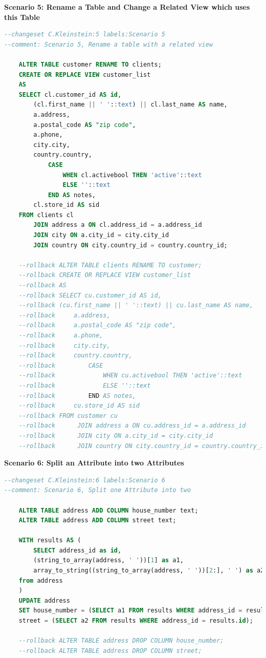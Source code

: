\newpage
\textbf{Scenario 5: Rename a Table and Change a Related View which uses this Table}\\
%
\begin{lstlisting}[language=SQL, caption={SQL Changeset Scenario 5: Rename a Table and Change a Related View which uses this Table}, label=list:scenarions:LiquibaseSQLScen5]
--changeset C.Kleinstein:5 labels:Scenario 5 
--comment: Scenario 5, Rename a table with a related view

	ALTER TABLE customer RENAME TO clients;
	CREATE OR REPLACE VIEW customer_list
	AS
	SELECT cl.customer_id AS id,
		(cl.first_name || ' '::text) || cl.last_name AS name,
		a.address,
		a.postal_code AS "zip code",
		a.phone,
		city.city,
		country.country,
			CASE
				WHEN cl.activebool THEN 'active'::text
				ELSE ''::text
			END AS notes,
		cl.store_id AS sid
	FROM clients cl
		JOIN address a ON cl.address_id = a.address_id
		JOIN city ON a.city_id = city.city_id
		JOIN country ON city.country_id = country.country_id;
	
	--rollback ALTER TABLE clients RENAME TO customer; 
	--rollback CREATE OR REPLACE VIEW customer_list
	--rollback AS
	--rollback SELECT cu.customer_id AS id,
	--rollback (cu.first_name || ' '::text) || cu.last_name AS name,
	--rollback     a.address,
	--rollback     a.postal_code AS "zip code",
	--rollback     a.phone,
	--rollback     city.city,
	--rollback     country.country,
	--rollback         CASE
	--rollback             WHEN cu.activebool THEN 'active'::text
	--rollback             ELSE ''::text
	--rollback         END AS notes,
	--rollback     cu.store_id AS sid
	--rollback FROM customer cu
	--rollback      JOIN address a ON cu.address_id = a.address_id
	--rollback      JOIN city ON a.city_id = city.city_id
	--rollback      JOIN country ON city.country_id = country.country_id;
\end{lstlisting}

\newpage
\textbf{Scenario 6: Split an Attribute into two Attributes}\\
%
\begin{lstlisting}[language=SQL, caption={SQL Changeset Scenario 6: Split an Attribute into two Attributes}, label=list:scenarions:LiquibaseSQLScen6]
--changeset C.Kleinstein:6 labels:Scenario 6
--comment: Scenario 6, Split one Attribute into two

	ALTER TABLE address ADD COLUMN house_number text;
	ALTER TABLE address ADD COLUMN street text;
	
	WITH results AS (
		SELECT address_id as id,
		(string_to_array(address, ' '))[1] as a1,
		array_to_string((string_to_array(address, ' '))[2:], ' ') as a2
	from address
	)
	UPDATE address
	SET house_number = (SELECT a1 FROM results WHERE address_id = results.id),
	street = (SELECT a2 FROM results WHERE address_id = results.id);
	
	--rollback ALTER TABLE address DROP COLUMN house_number;
	--rollback ALTER TABLE address DROP COLUMN street;
\end{lstlisting}

